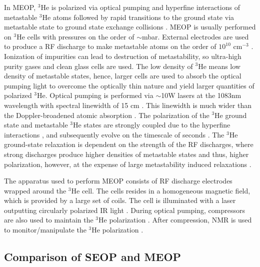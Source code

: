In MEOP, $^3$He is polarized via optical pumping and hyperfine interactions of metastable $^3$He atoms followed by rapid transitions to the ground state via metastable state to ground state exchange collisions \cite{Colegrove1963, Batz2011}.  MEOP is usually performed on $^3$He cells with pressures on the order of $\sim$mbar. External electrodes are used to produce a RF discharge to make metastable atoms on the order of $10^{10}$ cm$^{-3}$ \cite{Colegrove1963, Batz2011, Gentile2017}. Ionization of impurities can lead to destruction of metastability, so ultra-high purity gases and clean glass cells are used. The low density of $^3$He means low density of metastable states, hence, larger cells are used to absorb the optical pumping light to overcome the optically thin nature and  yield larger quantities of polarized $^3$He. Optical pumping is performed via $\sim$10W lasers at the 1083nm wavelength with spectral linewidth of 15 cm \cite{Colegrove1963, Batz2011, Gentile2017}. This linewidth is much wider than the Doppler-broadened atomic absorption \cite{Colegrove1963, Batz2011, Gentile2017}. The polarization of the $^3$He ground state and metastable $^3$He states are strongly coupled due to the hyperfine interactions \cite{Gentile2017}, and subsequently evolve on the timescale of seconds \cite{Gentile1993}. The $^3$He ground-state relaxation is dependent on the strength of the RF discharges, where strong discharges produce higher densities of metastable states and thus, higher polarization, however, at the expense of large metastability induced relaxations \cite{Batz2011, Gentile2017}. 

The apparatus used to perform MEOP consists of RF discharge electrodes wrapped around the $^3$He cell. The cells resides in a homogeneous magnetic field, which is provided by a large set of coils. The cell is illuminated with a laser outputting circularly polarized IR light \cite{Andersen2005}. During optical pumping, compressors are also used to maintain the $^3$He polarization \cite{Andersen2005}. After compression, NMR is used to monitor/manipulate the $^3$He polarization \cite{Romalis1998}.

\subsection{Comparison of SEOP and MEOP}

